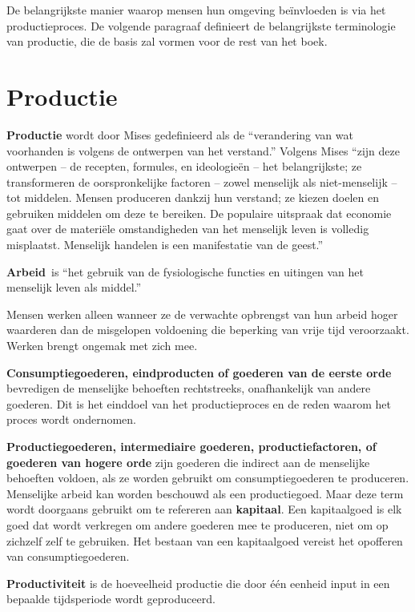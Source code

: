 De belangrijkste manier waarop mensen hun omgeving beïnvloeden is via
het productieproces. De volgende paragraaf definieert de belangrijkste
terminologie van productie, die de basis zal vormen voor de rest van het
boek.

\section{Productie}

\textbf{Productie} wordt door Mises gedefinieerd als de \enquote{verandering van
wat voorhanden is volgens de ontwerpen van het verstand.} Volgens Mises
\enquote{zijn deze ontwerpen -- de recepten, formules, en ideologieën -- het
belangrijkste; ze transformeren de oorspronkelijke factoren -- zowel
menselijk als niet-menselijk -- tot middelen. Mensen produceren dankzij
hun verstand; ze kiezen doelen en gebruiken middelen om deze te
bereiken. De populaire uitspraak dat economie gaat over de materiële
omstandigheden van het menselijk leven is volledig misplaatst. Menselijk
handelen is een manifestatie van de geest.}\autocite{39}

\textbf{Arbeid}~is \enquote{het gebruik van de fysiologische functies en
uitingen van het menselijk leven als middel.}\autocite{40}

Mensen werken alleen wanneer ze de verwachte opbrengst van hun arbeid
hoger waarderen dan de misgelopen voldoening die beperking van vrije
tijd veroorzaakt. Werken brengt ongemak met zich mee.

\textbf{Consumptiegoederen, eindproducten of goederen van de eerste
orde} bevredigen de menselijke behoeften rechtstreeks, onafhankelijk van
andere goederen. Dit is het einddoel van het productieproces en de reden
waarom het proces wordt ondernomen.

\textbf{Productiegoederen, intermediaire goederen, productiefactoren, of
goederen van hogere orde} zijn goederen die indirect aan de menselijke
behoeften voldoen, als ze worden gebruikt om consumptiegoederen te
produceren. Menselijke arbeid kan worden beschouwd als een
productiegoed. Maar deze term wordt doorgaans gebruikt om te refereren
aan \textbf{kapitaal}. Een kapitaalgoed is elk goed dat wordt verkregen
om andere goederen mee te produceren, niet om op zichzelf zelf te
gebruiken. Het bestaan van een kapitaalgoed vereist het opofferen van
consumptiegoederen.

\textbf{Productiviteit} is de hoeveelheid productie die door één eenheid
input in een bepaalde tijdsperiode wordt geproduceerd.

